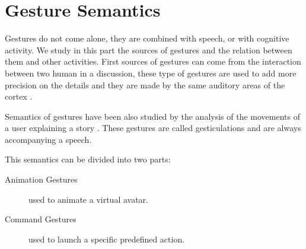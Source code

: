 \documentclass{llncs}
\newcommand\ignore[1]{}
\begin{document}
\section{Gesture Semantics}
Gestures do not come alone, they are combined with speech, or with cognitive
activity. We study in this part the sources of gestures and the relation between
them and other activities.
First sources of gestures can come from the interaction between two human in a
discussion, these type of gestures are used to add more precision on the details
and they are made by the same auditory areas of the cortex \cite{SymbolicGest}.

Semantics of gestures have been also studied by the analysis of the movements of
a user explaining a story \cite{gestureThought}.
These gestures are called gesticulations and are always accompanying a speech. 

This semantics can be divided into two parts:
\begin{description}
 \item[Animation Gestures] used to animate a virtual avatar.
 \item[Command Gestures] used to launch a specific predefined action.
\end{description}


\ignore{
Gesture recognition got the attention of HCI researchers in order to find better
ways to talk to the computer. The first one was the Hand Gestural Cursor
(Put-That-There[]) aiming to the simplification of the means of communication
between human and the machine.
Since then, the gesture definition included more techniques and got applied on
the 2D recognition which is the multi-touch gestures.
}
\end{document}
